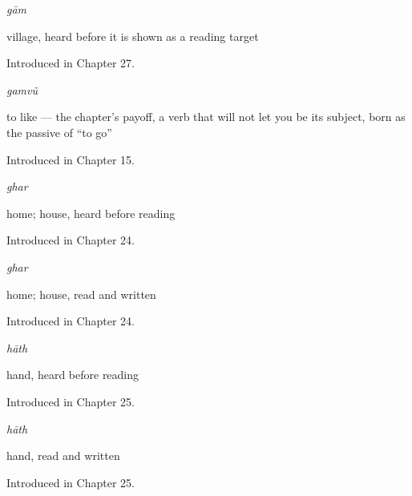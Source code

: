 \noindent\begin{minipage}[t]{\linewidth}
\raggedright
\textbf{}\enspace\emph{gām}\par
\small village, heard before it is shown as a reading target\par
\footnotesize Introduced in Chapter 27.
\end{minipage}\par\medskip

\noindent\begin{minipage}[t]{\linewidth}
\raggedright
\textbf{}\enspace\emph{gamvũ}\par
\small to like — the chapter's payoff, a verb that will not let you be its subject, born as the passive of \textquotedblleft{}to go\textquotedblright{}\par
\footnotesize Introduced in Chapter 15.
\end{minipage}\par\medskip

\noindent\begin{minipage}[t]{\linewidth}
\raggedright
\textbf{}\enspace\emph{ghar}\par
\small home; house, heard before reading\par
\footnotesize Introduced in Chapter 24.
\end{minipage}\par\medskip

\noindent\begin{minipage}[t]{\linewidth}
\raggedright
\textbf{}\enspace\emph{ghar}\par
\small home; house, read and written\par
\footnotesize Introduced in Chapter 24.
\end{minipage}\par\medskip

\noindent\begin{minipage}[t]{\linewidth}
\raggedright
\textbf{}\enspace\emph{hāth}\par
\small hand, heard before reading\par
\footnotesize Introduced in Chapter 25.
\end{minipage}\par\medskip

\noindent\begin{minipage}[t]{\linewidth}
\raggedright
\textbf{}\enspace\emph{hāth}\par
\small hand, read and written\par
\footnotesize Introduced in Chapter 25.
\end{minipage}\par\medskip

